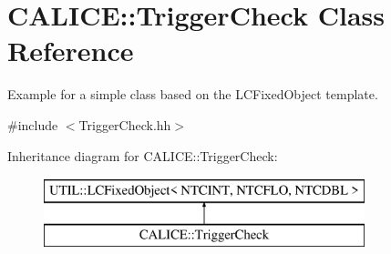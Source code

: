 \section{C\-A\-L\-I\-C\-E\-:\-:Trigger\-Check Class Reference}
\label{classCALICE_1_1TriggerCheck}


Example for a simple class based on the L\-C\-Fixed\-Object template.  




{\ttfamily \#include $<$Trigger\-Check.\-hh$>$}

Inheritance diagram for C\-A\-L\-I\-C\-E\-:\-:Trigger\-Check\-:\begin{figure}[H]
\begin{center}
\leavevmode
\includegraphics[height=2.000000cm]{classCALICE_1_1TriggerCheck}
\end{center}
\end{figure}
